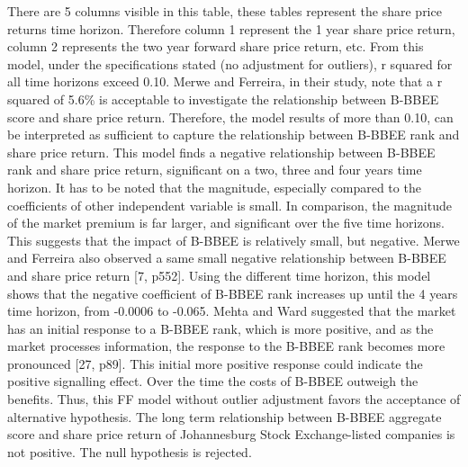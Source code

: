 There are 5 columns visible in this table, these tables represent the share price returns time horizon. Therefore column 1 represent the 1 year share price return, column 2 represents the two year forward share price return, etc. From this model, under the specifications stated (no adjustment for outliers), r squared for all time horizons exceed 0.10. Merwe and Ferreira, in their study, note that a r squared of 5.6\% is acceptable to investigate the relationship between B-BBEE score and share price return. Therefore, the model results of more than 0.10, can be interpreted as sufficient to capture the relationship between B-BBEE rank and share price return. This model finds a negative relationship between B-BBEE rank and share price return, significant on a two, three and four years time horizon. It has to be noted that the magnitude, especially compared to the coefficients of other independent variable is small. In comparison, the magnitude of the market premium is far larger, and significant over the five time horizons. This suggests that the impact of B-BBEE is relatively small, but negative. Merwe and Ferreira also observed a same small negative relationship between B-BBEE and share price return [7, p552]. Using the different time horizon, this model shows that the negative coefficient of B-BBEE rank increases up until the 4 years time horizon, from -0.0006 to -0.065. Mehta and Ward suggested that the market has an initial response to a B-BBEE rank, which is more positive, and as the market processes information, the response to the B-BBEE rank becomes more pronounced [27, p89]. This initial more positive response could indicate the positive signalling effect. Over the time the costs of B-BBEE outweigh the benefits. Thus, this FF model without outlier adjustment favors the acceptance of alternative hypothesis. The long term relationship between B-BBEE aggregate score and share price return of Johannesburg Stock Exchange-listed companies is not positive. The null hypothesis is rejected.


